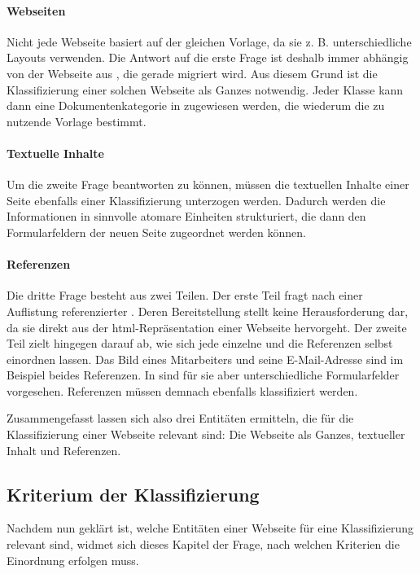         \paragraph*{Webseiten}
        Nicht jede Webseite basiert auf der gleichen Vorlage, da sie z. B. unterschiedliche Layouts verwenden.
        Die Antwort auf die erste Frage ist deshalb immer abhängig von der Webseite aus {\wordpress}, die gerade migriert wird.
        Aus diesem Grund ist die Klassifizierung einer solchen Webseite als Ganzes notwendig.
        Jeder Klasse kann dann eine Dokumentenkategorie in {\imperia}
        zugewiesen werden, die wiederum die zu nutzende Vorlage bestimmt.

        \paragraph*{Textuelle Inhalte}
        Um die zweite Frage beantworten zu können,
        müssen die textuellen Inhalte einer Seite ebenfalls einer Klassifizierung
        unterzogen werden.
        Dadurch werden die Informationen in sinnvolle atomare Einheiten strukturiert,
        die dann den Formularfeldern der neuen Seite zugeordnet werden können.

        \paragraph*{Referenzen}
        Die dritte Frage besteht aus zwei Teilen.
        Der erste Teil fragt nach einer Auflistung
        referenzierter {\resources}.
        Deren Bereitstellung stellt keine Herausforderung dar,
        da sie direkt aus der \gls{html}-Repräsentation einer Webseite hervorgeht.
        Der zweite Teil zielt hingegen darauf ab,
        wie sich jede einzelne {\resource} und die Referenzen selbst einordnen lassen.
        Das Bild eines Mitarbeiters und seine E-Mail-Adresse sind im Beispiel beides Referenzen.
        In {\imperia} sind für sie aber unterschiedliche Formularfelder vorgesehen.
        Referenzen müssen demnach ebenfalls klassifiziert werden.

        Zusammengefasst lassen sich also drei Entitäten ermitteln,
        die für die Klassifizierung einer Webseite relevant sind:
        Die Webseite als Ganzes, textueller Inhalt und Referenzen.

    \subsection{Kriterium der Klassifizierung}
        \label{section:ClassificationCriteria}
        Nachdem nun geklärt ist, welche Entitäten einer Webseite für
        eine Klassifizierung relevant sind,
        widmet sich dieses Kapitel der Frage, nach welchen
        Kriterien die Einordnung erfolgen muss.

